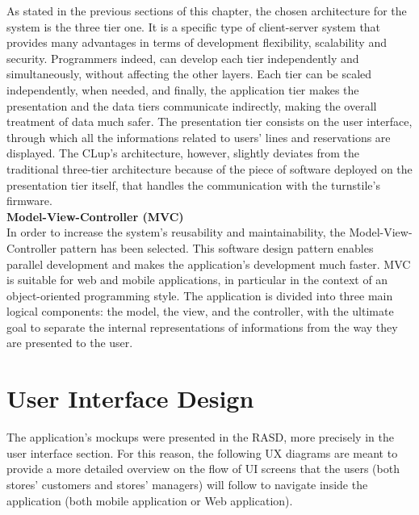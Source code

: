 \documentclass{article}
\begin{document}
\noindent As stated in the previous sections of this chapter, the chosen architecture for the system is the three tier one. It is a specific type of client-server system that provides many advantages in terms of development flexibility, scalability and security. Programmers indeed, can develop each tier independently and simultaneously, without affecting the other layers. Each tier can be scaled independently, when needed, and finally, the application tier makes the presentation and the data tiers communicate indirectly, making the overall treatment of data much safer. The presentation tier consists on the user interface, through which all the informations related to users’ lines and reservations are displayed. The CLup’s architecture, however, slightly deviates from the traditional three-tier architecture because of the piece of software deployed on the presentation tier itself, that handles the communication with the turnstile’s firmware.\\

\textbf{Model-View-Controller (MVC)}\\

\noindent In order to increase the system’s reusability and maintainability, the Model-View-Controller pattern has been selected. This software design pattern enables parallel development and makes the application’s development much faster. MVC is suitable for web and mobile applications, in particular in the context of an object-oriented programming style. The application is divided into three main logical components: the model, the view, and the controller, with the ultimate goal to separate the internal representations of informations from the way they are presented to the user.




\section{User Interface Design}
The application's mockups were presented in the RASD, more precisely in the user interface section. For this reason, the following UX diagrams are meant to provide a more detailed overview on the flow of UI screens that the users (both stores' customers and stores' managers) will follow to navigate inside the application (both mobile application or Web application).
\end{document}
